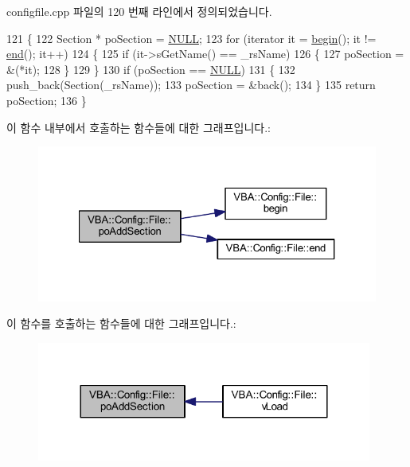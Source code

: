 configfile.\+cpp 파일의 120 번째 라인에서 정의되었습니다.


\begin{DoxyCode}
121 \{
122   Section * poSection = \mbox{\hyperlink{getopt1_8c_a070d2ce7b6bb7e5c05602aa8c308d0c4}{NULL}};
123   \textcolor{keywordflow}{for} (iterator it = \mbox{\hyperlink{class_v_b_a_1_1_config_1_1_file_a4dd88e6aa71829ce332139028225efcf}{begin}}(); it != \mbox{\hyperlink{class_v_b_a_1_1_config_1_1_file_a809724e386bf59c8726c33e822890c70}{end}}(); it++)
124   \{
125     \textcolor{keywordflow}{if} (it->sGetName() == \_rsName)
126     \{
127       poSection = &(*it);
128     \}
129   \}
130   \textcolor{keywordflow}{if} (poSection == \mbox{\hyperlink{getopt1_8c_a070d2ce7b6bb7e5c05602aa8c308d0c4}{NULL}})
131   \{
132     push\_back(Section(\_rsName));
133     poSection = &back();
134   \}
135   \textcolor{keywordflow}{return} poSection;
136 \}
\end{DoxyCode}
이 함수 내부에서 호출하는 함수들에 대한 그래프입니다.\+:
\nopagebreak
\begin{figure}[H]
\begin{center}
\leavevmode
\includegraphics[width=327pt]{class_v_b_a_1_1_config_1_1_file_a8a785523724a50c1d40a50ea6ada6a4c_cgraph}
\end{center}
\end{figure}
이 함수를 호출하는 함수들에 대한 그래프입니다.\+:
\nopagebreak
\begin{figure}[H]
\begin{center}
\leavevmode
\includegraphics[width=312pt]{class_v_b_a_1_1_config_1_1_file_a8a785523724a50c1d40a50ea6ada6a4c_icgraph}
\end{center}
\end{figure}
\mbox{\label{class_v_b_a_1_1_config_1_1_file_a0de8f36155786c73b91a22e62df27958}} 
